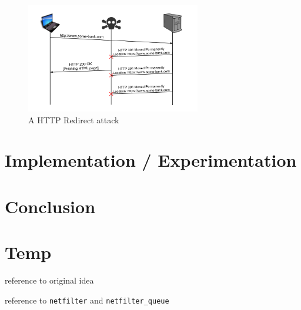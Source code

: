 \documentclass{article}
\begin{document}
\begin{figure}[t]
\begin{center}

\includegraphics[width=3in]{redirect_attack.png} 
\caption{A HTTP Redirect attack} 
\label{fg:attack}

\end{center}
\end{figure}

\section{Implementation / Experimentation}

\section{Conclusion}

\section{Temp}

reference to original idea\cite{offpath}

reference to \texttt{netfilter}\cite{netfilter} and \texttt{netfilter\_queue}\cite{netfilterQueue}



\end{document}
